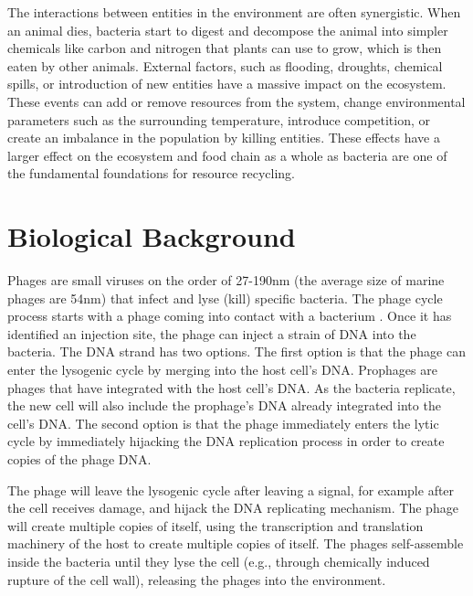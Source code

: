 The interactions between entities in the environment are often synergistic. 
When an animal dies, bacteria start to digest and decompose the animal into simpler chemicals like carbon and nitrogen that plants can use to grow, which is then eaten by other animals. 
External factors, such as flooding, droughts, chemical spills, or introduction of new entities have a massive impact on the ecosystem. 
These events can add or remove resources from the system, change environmental parameters such as the surrounding temperature, introduce competition, or create an imbalance in the population by killing entities. 
These effects have a larger effect on the ecosystem and food chain as a whole as bacteria are one of the fundamental foundations for resource recycling. 

\section{Biological Background}
Phages are small viruses on the order of 27-190nm (the average size of marine phages are 54nm) that infect and lyse (kill) specific bacteria.
The phage cycle process starts with a phage coming into contact with a bacterium .
Once it has identified an injection site, the phage can inject a strain of DNA into the bacteria.
The DNA strand has two options. 
The first option is that the phage can enter the lysogenic cycle by merging into the host cell's DNA. 
Prophages are phages that have integrated with the host cell's DNA. 
As the bacteria replicate, the new cell will also include the prophage's DNA already integrated into the cell's DNA. 
The second option is that the phage immediately enters the lytic cycle by immediately hijacking the DNA replication process in order to create copies of the phage DNA. 

The phage will leave the lysogenic cycle after leaving a signal, for example after the cell receives damage, and hijack the DNA replicating mechanism. 
The phage will create multiple copies of itself, using the transcription and translation machinery of the host to create multiple copies of itself.
The phages self-assemble inside the bacteria until they lyse the cell (e.g., through chemically induced rupture of the cell wall), releasing the phages into the environment. 

